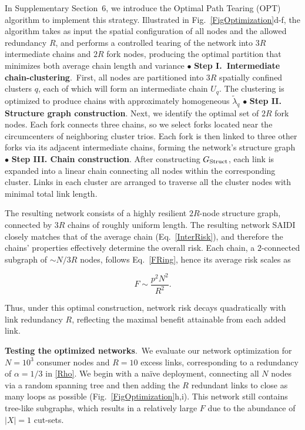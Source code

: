 \documentclass[oneside, a4paper, onecolumn, 11pt]{article}
\begin{document}
\begin{refsection}
In Supplementary Section~6, we introduce the Optimal Path Tearing (OPT) algorithm to implement this strategy. Illustrated in Fig.~\ref{FigOptimization}d-f, the algorithm takes as input the spatial configuration of all nodes and the allowed redundancy $R$, and performs a controlled tearing of the network into $3R$ intermediate chains and $2R$ fork nodes, producing the optimal partition that minimizes both average chain length and variance 
$\bullet$
\textbf{Step I.\ Intermediate chain-clustering}.\
First, all nodes are partitioned into $3R$ spatially confined clusters $q$, each of which will form an intermediate chain $U_q$. The clustering is optimized to produce chains with approximately homogeneous $\tilde \lambda_q$ 
$\bullet$ 
\textbf{Step II. Structure graph construction}.
Next, we identify the optimal set of $2R$ fork nodes. Each fork connects three chains, so we select forks located near the circumcenters of neighboring cluster trios. Each fork is then linked to three other forks via its adjacent intermediate chains, forming the network’s structure graph 
$\bullet$
\textbf{Step III. Chain construction}.
After constructing $G_{\rm Struct}$, each link is expanded into a linear chain connecting all nodes within the corresponding cluster. Links in each cluster are arranged to traverse all the cluster nodes with minimal total link length.

The resulting network consists of a highly resilient $2R$-node structure graph, connected by $3R$ chains of roughly uniform length. The resulting network SAIDI closely matches that of the average chain (Eq.~\eqref{InterRisk}), and therefore the chains’ properties effectively determine the overall risk. Each chain, a $2$-connected subgraph of $\sim N/3R$ nodes, follows Eq.~\eqref{FRing}, hence its average risk scales as

\begin{equation}
\label{FOpt}
F \sim \frac{p^2 N^2}{R^2}.
\end{equation}

Thus, under this optimal construction, network risk decays quadratically with link redundancy $R$, reflecting the maximal benefit attainable from each added link.

\vspace{3mm}
\textbf{\color{blue}Testing the optimized networks}.\
We evaluate our network optimization for $N = 10^3$ consumer nodes and $R = 10$ excess links, corresponding to a redundancy of $\alpha = 1/3$ in \eqref{Rho}. We begin with a na\"{i}ve deployment, connecting all $N$ nodes via a random spanning tree and then adding the $R$ redundant links to close as many loops as possible (Fig.~\ref{FigOptimization}h,i). This network still contains tree-like subgraphs, which results in a relatively large $F$ due to the abundance of $|X| = 1$ cut-sets.


\end{refsection}
\end{document}
